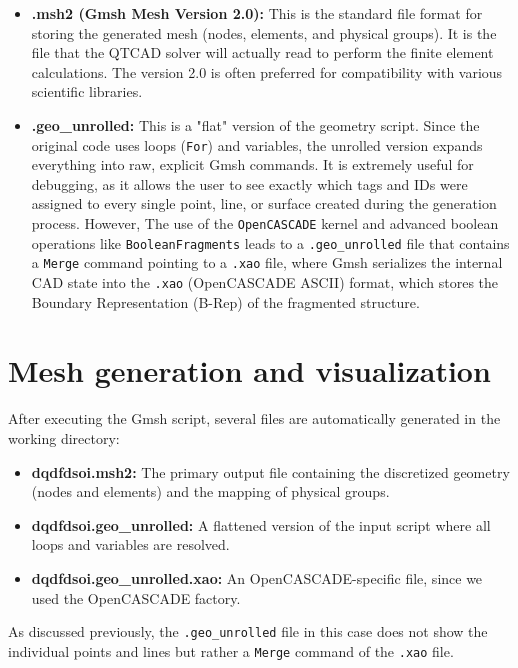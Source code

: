 \begin{itemize}
    \item \textbf{.msh2 (Gmsh Mesh Version 2.0):} This is the standard file format for storing the generated mesh (nodes, elements, and physical groups). It is the file that the QTCAD solver will actually read to perform the finite element calculations. The version 2.0 is often preferred for compatibility with various scientific libraries.
    \item \textbf{.geo\_unrolled:} This is a "flat" version of the geometry script. Since the original code uses loops (\texttt{For}) and variables, the unrolled version expands everything into raw, explicit Gmsh commands. It is extremely useful for debugging, as it allows the user to see exactly which tags and IDs were assigned to every single point, line, or surface created during the generation process. However, The use of the \texttt{OpenCASCADE} kernel and advanced boolean operations like \texttt{BooleanFragments} leads to a \texttt{.geo\_unrolled} file that contains a \texttt{Merge} command pointing to a \texttt{.xao} file, where Gmsh serializes the internal CAD state into the \texttt{.xao} (OpenCASCADE ASCII) format, which stores the Boundary Representation (B-Rep) of the fragmented structure.
\end{itemize}

\newpage
\section{Mesh generation and visualization}
After executing the Gmsh script, several files are automatically generated in the working directory:
\begin{itemize}
    \item \textbf{dqdfdsoi.msh2:} The primary output file containing the discretized geometry (nodes and elements) and the mapping of physical groups.
    \item \textbf{dqdfdsoi.geo\_unrolled:} A flattened version of the input script where all loops and variables are resolved.
    \item \textbf{dqdfdsoi.geo\_unrolled.xao:} An OpenCASCADE-specific file, since we used the OpenCASCADE factory.
\end{itemize}
As discussed previously, the \texttt{.geo\_unrolled} file in this case does not show the individual points and lines but rather a \texttt{Merge} command of the \texttt{.xao} file.

